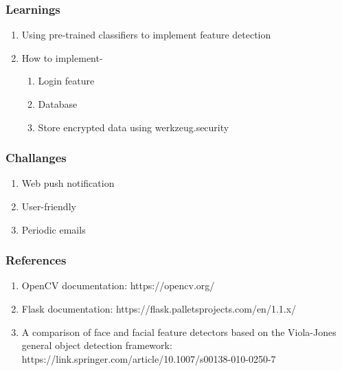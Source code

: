 \documentclass[14pt]{beamer}
\begin{document}
\begin{frame}
    \frametitle{Learnings}
    \begin{enumerate}
        \item Using pre-trained classifiers to implement feature detection
        \item How to implement-
        \begin{enumerate}
            \item Login feature
            \item Database
            \item Store encrypted data using werkzeug.security
        \end{enumerate}
    \end{enumerate}
\end{frame}
\begin{frame}
    \frametitle{Challanges}
    \begin{enumerate}
        \item Web push notification
        \item User-friendly
        \item Periodic emails
    \end{enumerate}
\end{frame}

\begin{frame}
    \frametitle{References}
    \begin{enumerate}
        \item OpenCV documentation: 
        \baselineskip
        https://opencv.org/
        \item Flask documentation: 
        \baselineskip
        https://flask.palletsprojects.com/en/1.1.x/
        \item A comparison of face and facial feature detectors based on the Viola-Jones general object detection framework: 
        \baselineskip
        https://link.springer.com/article/10.1007/s00138-010-0250-7
    \end{enumerate}
\end{frame}
\end{document}
